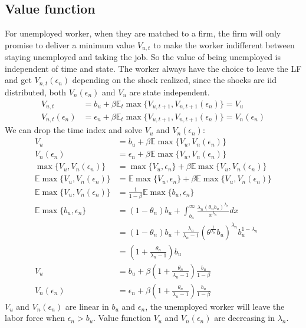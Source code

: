 \documentclass{article}
\newcommand{\E}{\mathbb{E}}
\newcommand{\1}{\mathbb{1}}
\begin{document}
\subsection{Value function}
For unemployed worker, when they are matched to a firm, the firm will only promise to deliver a minimum value $V_{u,t}$ to make the worker indifferent between staying unemployed and taking the job. So the value of being unemployed is independent of time and state. The worker always have the choice to leave the LF and get $V_{n,t}(\epsilon_n)$ depending on the shock realized, since the shocks are iid distributed, both $V_n(\epsilon_n)$ and $V_u$ are state independent. 
\begin{align*}
V_{u,t} &= b_u+\beta\E_t\max\{V_{u,t+1},V_{n,t+1}(\epsilon_n)\} = V_u \\
V_{n,t}(\epsilon_n) &= \epsilon_n+\beta\E_t\max\{V_{u,t+1},V_{n,t+1}(\epsilon_n)\} = V_{n}(\epsilon_n) 
\end{align*}
We can drop the time index and solve $V_u$ and $V_n(\epsilon_n)$: 
\begin{align*}
V_u &= b_u+\beta\E\max\{V_u,V_n(\epsilon_n)\} \\
V_n(\epsilon_n) &= \epsilon_n+\beta\E\max\{V_u,V_n(\epsilon_n)\}  \\
\max\{V_u,V_n(\epsilon_n)\} &= \max \{V_u,\epsilon_n\}+\beta\E\max\{V_u,V_n(\epsilon_n)\}  \\
\E\max\{V_u,V_n(\epsilon_n)\} &= \E\max \{V_u,\epsilon_n\}+\beta\E\max\{V_u,V_n(\epsilon_n)\}  \\
\E\max\{V_u,V_n(\epsilon_n)\} &= \frac{1}{1-\beta}\E\max \{b_u,\epsilon_n\}  \\
\E\max \{b_u,\epsilon_n\}  &= (1-\theta_n)b_u+\int_{b_u}^{\infty}\frac{\lambda_n(\theta_n b_u)^{\lambda_n}}{x^{\lambda_n}}dx \\
										&= (1-\theta_n)b_u+\frac{\lambda_n}{\lambda_n-1}(\theta^{\frac{1}{\lambda_n}}b_u)^{\lambda_n}b_u^{1-\lambda_n} \\
										&= (1+\frac{\theta_n}{\lambda_n-1})b_u \\
V_u &= b_u+\beta(1+\frac{\theta_n}{\lambda_n-1})\frac{b_u}{1-\beta}\\
V_n(\epsilon_n) &= \epsilon_n+\beta(1+\frac{\theta_n}{\lambda_n-1})\frac{b_u}{1-\beta} 
\end{align*}
$V_u$ and $V_n(\epsilon_n)$ are linear in $b_u$ and $\epsilon_n$, the unemployed worker will leave the labor force when $\epsilon_n>b_u$. Value function $V_u$ and $V_n(\epsilon_n)$ are decreasing in $\lambda_n$. \\
\end{document}
